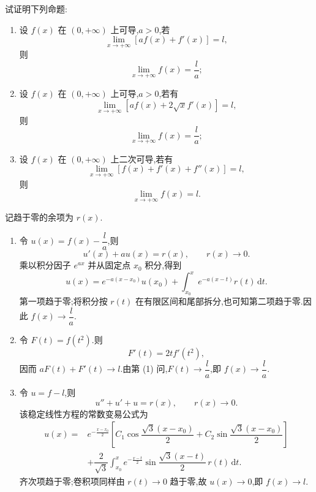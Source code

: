 \begin{example}[\markstar]
    试证明下列命题:
    \begin{enumerate}
        \item 设 $f(x)$ 在 $(0,+\infty)$ 上可导,$a>0$,若
              \[
                  \displaystyle\lim\limits_{x\to+\infty}[af(x)+f'(x)]=l,
              \]
              则
              \[
                  \displaystyle\lim\limits_{x\to+\infty}f(x)=\dfrac{l}{a};
              \]
        \item 设 $f(x)$ 在 $(0,+\infty)$ 上可导,$a>0$,若有
              \[
                  \displaystyle\lim\limits_{x\to+\infty}[af(x)+2\sqrt{x}f'(x)]=l,
              \]
              则
              \[
                  \displaystyle\lim\limits_{x\to+\infty}f(x)=\dfrac{l}{a};
              \]
        \item 设 $f(x)$ 在 $(0,+\infty)$ 上二次可导,若有
              \[
                  \displaystyle\lim\limits_{x\to+\infty}[f(x)+f'(x)+f''(x)]=l,
              \]
              则
              \[
                  \displaystyle\lim\limits_{x\to+\infty}f(x)=l.
              \]
    \end{enumerate}
\end{example}
\exampleblank

\begin{solution}
    记趋于零的余项为 $r(x)$.

    \begin{enumerate}
        \item 令 $u(x)=f(x)-\dfrac{l}{a}$,则
              \[
                  u'(x)+au(x)=r(x),
                  \qquad r(x)\to0.
              \]
              乘以积分因子 $e^{ax}$ 并从固定点 $x_0$ 积分,得到
              \[
                  u(x)=e^{-a(x-x_0)}u(x_0)
                  +\int_{x_0}^{x}e^{-a(x-t)}r(t)\,\mathrm{d}t.
              \]
              第一项趋于零;将积分按 $r(t)$ 在有限区间和尾部拆分,也可知第二项趋于零.因此 $f(x)\to\dfrac{l}{a}$.

        \item 令 $F(t)=f(t^2)$.则
              \[
                  F'(t)=2t f'(t^2),
              \]
              因而 $aF(t)+F'(t)\to l$.由第 (1) 问,$F(t)\to\dfrac{l}{a}$,即 $f(x)\to\dfrac{l}{a}$.

        \item 令 $u=f-l$,则
              \[
                  u''+u'+u=r(x),
                  \qquad r(x)\to0.
              \]
              该稳定线性方程的常数变易公式为
              \[
                  \begin{aligned}
                      u(x)={} & e^{-\frac{x-x_0}{2}}
                      \left[C_1\cos\dfrac{\sqrt3(x-x_0)}{2}
                      +C_2\sin\dfrac{\sqrt3(x-x_0)}{2}\right]                      \\
                              & +\dfrac{2}{\sqrt3}\int_{x_0}^{x}e^{-\frac{x-t}{2}}
                      \sin\dfrac{\sqrt3(x-t)}{2}\,r(t)\,\mathrm{d}t.
                  \end{aligned}
              \]
              齐次项趋于零;卷积项同样由 $r(t)\to0$ 趋于零,故 $u(x)\to0$,即 $f(x)\to l$.
    \end{enumerate}
\end{solution}

